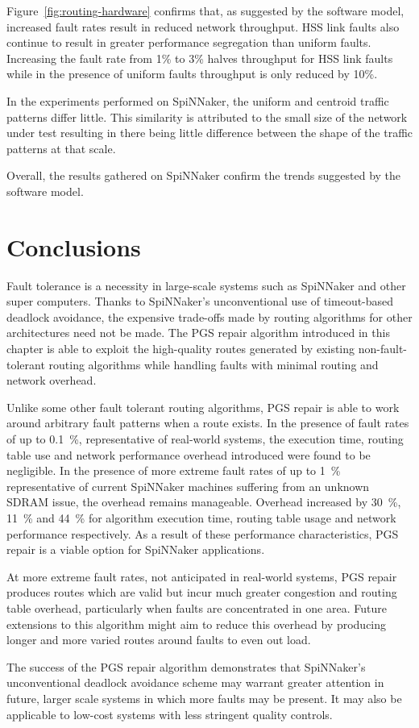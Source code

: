 				Figure~\ref{fig:routing-hardware} confirms that, as suggested by the
				software model, increased fault rates result in reduced network
				throughput. HSS link faults also continue to result in greater
				performance segregation than uniform faults. Increasing the fault rate
				from 1\% to 3\% halves throughput for HSS link faults while in the
				presence of uniform faults throughput is only reduced by 10\%.
				
				In the experiments performed on SpiNNaker, the uniform and centroid
				traffic patterns differ little. This similarity is attributed to the
				small size of the network under test resulting in there being little
				difference between the shape of the traffic patterns at that scale.
				
				Overall, the results gathered on SpiNNaker confirm the trends suggested
				by the software model.
		
	\section{Conclusions}
		
		Fault tolerance is a necessity in large-scale systems such as SpiNNaker and
		other super computers. Thanks to SpiNNaker's unconventional use of
		timeout-based deadlock avoidance, the expensive trade-offs made by routing
		algorithms for other architectures need not be made. The PGS repair
		algorithm introduced in this chapter is able to exploit the high-quality
		routes generated by existing non-fault-tolerant routing algorithms while
		handling faults with minimal routing and network overhead.
		
		Unlike some other fault tolerant routing algorithms, PGS repair is able to
		work around arbitrary fault patterns when a route exists. In the presence
		of fault rates of up to \SI{0.1}{\percent}, representative of real-world
		systems, the execution time, routing table use and network performance
		overhead introduced were found to be negligible.  In the presence of more
		extreme fault rates of up to \SI{1}{\percent} representative of current
		SpiNNaker machines suffering from an unknown SDRAM issue, the overhead
		remains manageable. Overhead increased by \SI{30}{\percent},
		\SI{11}{\percent} and \SI{44}{\percent} for algorithm execution time,
		routing table usage and network performance respectively.  As a result of
		these performance characteristics, PGS repair is a viable option for
		SpiNNaker applications.
		
		At more extreme fault rates, not anticipated in real-world systems, PGS
		repair produces routes which are valid but incur much greater congestion
		and routing table overhead, particularly when faults are concentrated in
		one area. Future extensions to this algorithm might aim to reduce this
		overhead by producing longer and more varied routes around faults to even
		out load.
		
		The success of the PGS repair algorithm demonstrates that SpiNNaker's
		unconventional deadlock avoidance scheme may warrant greater attention in
		future, larger scale systems in which more faults may be present. It may
		also be applicable to low-cost systems with less stringent quality
		controls.
